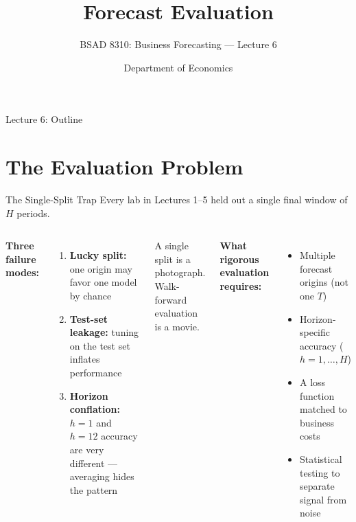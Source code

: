 \documentclass[aspectratio=169, 11pt]{beamer}
\title{Forecast Evaluation}
\subtitle{BSAD 8310: Business Forecasting --- Lecture 6}
\author{Department of Economics}
\institute{University of Nebraska at Omaha}
\begin{document}

\begin{frame}
  \titlepage
\end{frame}

\begin{frame}{Lecture 6: Outline}
  \tableofcontents
\end{frame}

\section{The Evaluation Problem}


\begin{frame}{The Single-Split Trap}
  Every lab in Lectures 1--5 held out a single final window of $H$ periods.
  \begin{columns}[T]
      \textbf{Three failure modes:}
      \begin{enumerate}\small
        \item \textbf{Lucky split:} one origin may favor one model by chance
        \item \textbf{Test-set leakage:} tuning on the test set inflates performance
        \item \textbf{Horizon conflation:} $h=1$ and $h=12$ accuracy are very
              different --- averaging hides the pattern
      \end{enumerate}
      \vspace{0.1cm}
      \begin{warningbox}
        {\small A single split is a photograph.
        Walk-forward evaluation is a movie.}
      \end{warningbox}
      \textbf{What rigorous evaluation requires:}
      \begin{itemize}\small
        \item Multiple forecast origins (not one $T$)
        \item Horizon-specific accuracy ($h=1,\ldots,H$)
        \item A loss function matched to business costs
        \item Statistical testing to separate signal from noise
      \end{itemize}
  \end{columns}
\end{frame}
\end{document}
